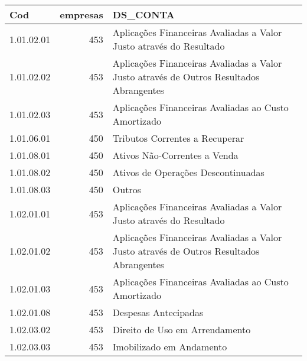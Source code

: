 \begin{table}[ht]
\centering
\begin{tabular}{lrl}
  \hline
Cod & empresas & DS\_CONTA \\ 
  \hline
1.01.02.01 & 453 & Aplicações Financeiras Avaliadas a Valor Justo através do Resultado \\ 
  1.01.02.02 & 453 & Aplicações Financeiras Avaliadas a Valor Justo através de Outros Resultados Abrangentes \\ 
  1.01.02.03 & 453 & Aplicações Financeiras Avaliadas ao Custo Amortizado \\ 
  1.01.06.01 & 450 & Tributos Correntes a Recuperar \\ 
  1.01.08.01 & 450 & Ativos Não-Correntes a Venda \\ 
  1.01.08.02 & 450 & Ativos de Operações Descontinuadas \\ 
  1.01.08.03 & 450 & Outros \\ 
  1.02.01.01 & 453 & Aplicações Financeiras Avaliadas a Valor Justo através do Resultado \\ 
  1.02.01.02 & 453 & Aplicações Financeiras Avaliadas a Valor Justo através de Outros Resultados Abrangentes \\ 
  1.02.01.03 & 453 & Aplicações Financeiras Avaliadas ao Custo Amortizado \\ 
  1.02.01.08 & 453 & Despesas Antecipadas \\ 
  1.02.03.02 & 453 & Direito de Uso em Arrendamento \\ 
  1.02.03.03 & 453 & Imobilizado em Andamento \\ 
   \hline
\end{tabular}
\end{table}
